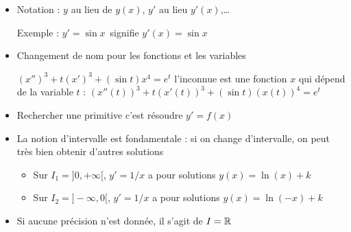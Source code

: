 \begin{frame}

\begin{itemize}
  \item Notation : $y$ au lieu de $y(x)$, 
  $y'$ au lieu $y'(x)$,\ldots
  \pause
  
  Exemple : \og$y' = \sin x$\fg\ signifie \og$y'(x) = \sin x$\fg
  
    \pause
  \item Changement de nom pour les fonctions et les variables 
  
  \pause
  $(x'')^3+t(x')^3+(\sin t) x^4=e^t$
  l'inconnue est une fonction $x$ qui dépend de la variable $t$ :
  $(x''(t))^3+t(x'(t))^3+(\sin t) (x(t))^4=e^t$

  \pause
  
  \item Rechercher une primitive c'est résoudre $y'= f(x)$
   
  \pause
  
  \item La notion d'intervalle est fondamentale : 
  si on change d'intervalle, on peut très bien obtenir d'autres solutions
  
  \pause
  
  \begin{itemize}
    \item Sur $I_1 = ]0, +\infty[$, $y' = 1/x$ a pour solutions $y(x) = \ln(x) + k$
    \pause
    \item Sur $I_2 = ]-\infty, 0[$, $y' = 1/x$ a pour solutions $y(x) = \ln(-x) + k$
  \end{itemize} 
  
  \pause
  \item Si aucune précision n'est donnée, il s'agit de $I = \mathbb{R}$
\end{itemize}  
\end{frame}



